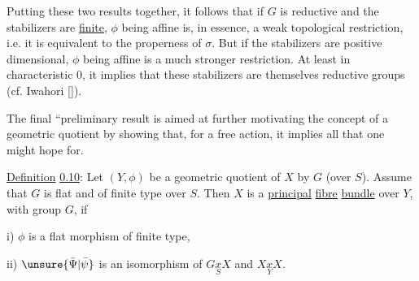 
Putting these two results together, it follows that if $G$ is reductive and the stabilizers are \uline{finite}, $\phi$ being affine is, in essence, a weak topological restriction, i.e. it is equivalent to the properness of $\sigma$. But if the stabilizers are positive dimensional, $\phi$ being affine is a much stronger restriction. At least in characteristic 0, it implies that these stabilizers are themselves reductive groups (cf. Iwahori [\quad]).

The final ``preliminary result is aimed at further motivating the concept of a geometric quotient by showing that, for a free action, it implies all that one might hope for.

\uline{Definition} \uline{0.10}: Let $(Y,\phi)$ be a geometric quotient of $X$ by $G$ (over $S$). Assume that $G$ is flat and of finite type over $S$. Then $X$ is a \uline{principal} \uline{fibre} \uline{bundle} over $Y$, with group $G$, if

\qquad i) $\phi$ is a flat morphism of finite type,

\qquad ii) $\unsure{\bar\Psi|\bar\psi}$ is an isomorphism of $G\mathbin{\underset{S}{x}}X$ and $X\mathbin{\underset{Y}{x}}X$.

